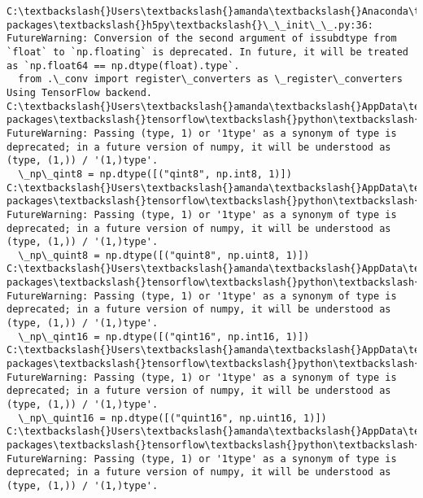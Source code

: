 \documentclass[11pt]{article}
\begin{document}
    \begin{Verbatim}[commandchars=\\\{\}]
C:\textbackslash{}Users\textbackslash{}amanda\textbackslash{}Anaconda\textbackslash{}lib\textbackslash{}site-packages\textbackslash{}h5py\textbackslash{}\_\_init\_\_.py:36: FutureWarning: Conversion of the second argument of issubdtype from `float` to `np.floating` is deprecated. In future, it will be treated as `np.float64 == np.dtype(float).type`.
  from .\_conv import register\_converters as \_register\_converters
Using TensorFlow backend.
C:\textbackslash{}Users\textbackslash{}amanda\textbackslash{}AppData\textbackslash{}Roaming\textbackslash{}Python\textbackslash{}Python36\textbackslash{}site-packages\textbackslash{}tensorflow\textbackslash{}python\textbackslash{}framework\textbackslash{}dtypes.py:523: FutureWarning: Passing (type, 1) or '1type' as a synonym of type is deprecated; in a future version of numpy, it will be understood as (type, (1,)) / '(1,)type'.
  \_np\_qint8 = np.dtype([("qint8", np.int8, 1)])
C:\textbackslash{}Users\textbackslash{}amanda\textbackslash{}AppData\textbackslash{}Roaming\textbackslash{}Python\textbackslash{}Python36\textbackslash{}site-packages\textbackslash{}tensorflow\textbackslash{}python\textbackslash{}framework\textbackslash{}dtypes.py:524: FutureWarning: Passing (type, 1) or '1type' as a synonym of type is deprecated; in a future version of numpy, it will be understood as (type, (1,)) / '(1,)type'.
  \_np\_quint8 = np.dtype([("quint8", np.uint8, 1)])
C:\textbackslash{}Users\textbackslash{}amanda\textbackslash{}AppData\textbackslash{}Roaming\textbackslash{}Python\textbackslash{}Python36\textbackslash{}site-packages\textbackslash{}tensorflow\textbackslash{}python\textbackslash{}framework\textbackslash{}dtypes.py:525: FutureWarning: Passing (type, 1) or '1type' as a synonym of type is deprecated; in a future version of numpy, it will be understood as (type, (1,)) / '(1,)type'.
  \_np\_qint16 = np.dtype([("qint16", np.int16, 1)])
C:\textbackslash{}Users\textbackslash{}amanda\textbackslash{}AppData\textbackslash{}Roaming\textbackslash{}Python\textbackslash{}Python36\textbackslash{}site-packages\textbackslash{}tensorflow\textbackslash{}python\textbackslash{}framework\textbackslash{}dtypes.py:526: FutureWarning: Passing (type, 1) or '1type' as a synonym of type is deprecated; in a future version of numpy, it will be understood as (type, (1,)) / '(1,)type'.
  \_np\_quint16 = np.dtype([("quint16", np.uint16, 1)])
C:\textbackslash{}Users\textbackslash{}amanda\textbackslash{}AppData\textbackslash{}Roaming\textbackslash{}Python\textbackslash{}Python36\textbackslash{}site-packages\textbackslash{}tensorflow\textbackslash{}python\textbackslash{}framework\textbackslash{}dtypes.py:527: FutureWarning: Passing (type, 1) or '1type' as a synonym of type is deprecated; in a future version of numpy, it will be understood as (type, (1,)) / '(1,)type'.

\end{Verbatim}
\end{document}
